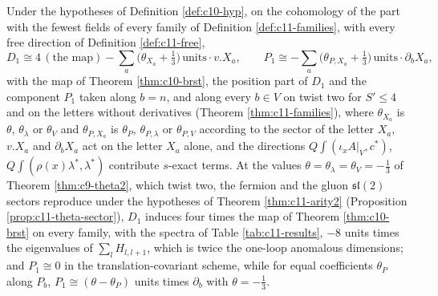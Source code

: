 \begin{corollary}
\label{cor:c11-D1fam}
Under the hypotheses of Definition \ref{def:c10-hyp}, on the cohomology of the part with the fewest fields of every family of Definition \ref{def:c11-families}, with every free direction of Definition \ref{def:c11-free},
\[
D_1\cong4\,(\text{the map})-\sum_a\big(\theta_{X_a}+\tfrac13\big)\,\text{units}\cdot v.X_a,\qquad P_1\cong-\sum_a\big(\theta_{P,X_a}+\tfrac13\big)\,\text{units}\cdot\partial_bX_a,
\]
with the map of Theorem \ref{thm:c10-brst}, the position part of $D_1$ and the component $P_1$ taken along $b=n$, and along every $b\in V$ on twist two for $S'\le4$ and on the letters without derivatives (Theorem \ref{thm:c11-families}), where $\theta_{X_a}$ is $\theta$, $\theta_\lambda$ or $\theta_V$ and $\theta_{P,X_a}$ is $\theta_P$, $\theta_{P,\lambda}$ or $\theta_{P,V}$ according to the sector of the letter $X_a$, $v.X_a$ and $\partial_bX_a$ act on the letter $X_a$ alone, and the directions $Q\int(\iota_xA|_V,c^*)$, $Q\int(\rho(x)\lambda^*,\lambda^*)$ contribute $s$-exact terms. At the values $\theta=\theta_\lambda=\theta_V=-\tfrac13$ of Theorem \ref{thm:c9-theta2}, which twist two, the fermion and the gluon $\mathfrak{sl}(2)$ sectors reproduce under the hypotheses of Theorem \ref{thm:c11-arity2} (Proposition \ref{prop:c11-theta-sector}), $D_1$ induces four times the map of Theorem \ref{thm:c10-brst} on every family, with the spectra of Table \ref{tab:c11-results}, $-8$ units times the eigenvalues of $\sum_lH_{l,l+1}$, which is twice the one-loop anomalous dimensions; and $P_1\cong0$ in the translation-covariant scheme, while for equal coefficients $\theta_P$ along $P_b$, $P_1\cong(\theta-\theta_P)$ units times $\partial_b$ with $\theta=-\tfrac13$.
\end{corollary}
